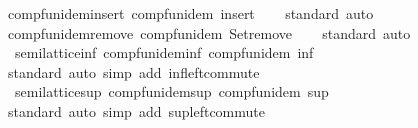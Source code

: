 \begin{isabellebody}
\endisatagproof
{\isafoldproof}%
%
\isadelimproof
\isanewline
%
\endisadelimproof
\isanewline
{}\isamarkupfalse%
\ comp{\isacharunderscore}{\kern0pt}fun{\isacharunderscore}{\kern0pt}idem{\isacharunderscore}{\kern0pt}insert{\isacharcolon}{\kern0pt}\ {\isachardoublequoteopen}comp{\isacharunderscore}{\kern0pt}fun{\isacharunderscore}{\kern0pt}idem\ insert{\isachardoublequoteclose}\isanewline
%
\isadelimproof
\ \ %
\endisadelimproof
%
\isatagproof
{}\isamarkupfalse%
\ standard\ auto%
\endisatagproof
{\isafoldproof}%
%
\isadelimproof
\isanewline
%
\endisadelimproof
\isanewline
{}\isamarkupfalse%
\ comp{\isacharunderscore}{\kern0pt}fun{\isacharunderscore}{\kern0pt}idem{\isacharunderscore}{\kern0pt}remove{\isacharcolon}{\kern0pt}\ {\isachardoublequoteopen}comp{\isacharunderscore}{\kern0pt}fun{\isacharunderscore}{\kern0pt}idem\ Set{\isachardot}{\kern0pt}remove{\isachardoublequoteclose}\isanewline
%
\isadelimproof
\ \ %
\endisadelimproof
%
\isatagproof
{}\isamarkupfalse%
\ standard\ auto%
\endisatagproof
{\isafoldproof}%
%
\isadelimproof
\isanewline
%
\endisadelimproof
\isanewline
{}\isamarkupfalse%
\ {\isacharparenleft}{\kern0pt}\ semilattice{\isacharunderscore}{\kern0pt}inf{\isacharparenright}{\kern0pt}\ comp{\isacharunderscore}{\kern0pt}fun{\isacharunderscore}{\kern0pt}idem{\isacharunderscore}{\kern0pt}inf{\isacharcolon}{\kern0pt}\ {\isachardoublequoteopen}comp{\isacharunderscore}{\kern0pt}fun{\isacharunderscore}{\kern0pt}idem\ inf{\isachardoublequoteclose}\isanewline
%
\isadelimproof
\ \ %
\endisadelimproof
%
\isatagproof
{}\isamarkupfalse%
\ standard\ {\isacharparenleft}{\kern0pt}auto\ simp\ add{\isacharcolon}{\kern0pt}\ inf{\isacharunderscore}{\kern0pt}left{\isacharunderscore}{\kern0pt}commute{\isacharparenright}{\kern0pt}%
\endisatagproof
{\isafoldproof}%
%
\isadelimproof
\isanewline
%
\endisadelimproof
\isanewline
{}\isamarkupfalse%
\ {\isacharparenleft}{\kern0pt}\ semilattice{\isacharunderscore}{\kern0pt}sup{\isacharparenright}{\kern0pt}\ comp{\isacharunderscore}{\kern0pt}fun{\isacharunderscore}{\kern0pt}idem{\isacharunderscore}{\kern0pt}sup{\isacharcolon}{\kern0pt}\ {\isachardoublequoteopen}comp{\isacharunderscore}{\kern0pt}fun{\isacharunderscore}{\kern0pt}idem\ sup{\isachardoublequoteclose}\isanewline
%
\isadelimproof
\ \ %
\endisadelimproof
%
\isatagproof
{}\isamarkupfalse%
\ standard\ {\isacharparenleft}{\kern0pt}auto\ simp\ add{\isacharcolon}{\kern0pt}\ sup{\isacharunderscore}{\kern0pt}left{\isacharunderscore}{\kern0pt}commute{\isacharparenright}{\kern0pt}%

\end{isabellebody}
